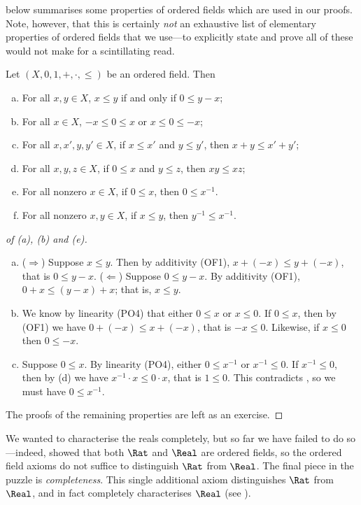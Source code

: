  below summarises some properties of ordered fields which are used in our proofs. Note, however, that this is certainly \textit{not} an exhaustive list of elementary properties of ordered fields that we use---to explicitly state and prove all of these would not make for a scintillating read.

\begin{theorem}
\label{thmPropertiesOfOrderedFields}
Let $(X,0,1,+,{\cdot},{\le})$ be an ordered field. Then
\begin{enumerate}[(a)]
\item For all $x,y \in X$, $x \le y$ if and only if $0 \le y-x$;
\item For all $x \in X$, $-x \le 0 \le x$ or $x \le 0 \le -x$;
\item For all $x,x',y,y' \in X$, if $x \le x'$ and $y \le y'$, then $x + y \le x' + y'$;
\item For all $x,y,z \in X$, if $0 \le x$ and $y \le z$, then $xy \le xz$;
\item For all nonzero $x \in X$, if $0 \le x$, then $0 \le x^{-1}$.
\item For all nonzero $x,y \in X$, if $x \le y$, then $y^{-1} \le x^{-1}$.
\end{enumerate}
\end{theorem}
\begin{proof}[of {(a)}, {(b)} and {(e)}]
$ $
\begin{enumerate}[(a)] 
\item ($\Rightarrow$) Suppose $x \le y$. Then by additivity (OF1), $x+(-x) \le y+(-x)$, that is $0 \le y-x$. ($\Leftarrow$) Suppose $0 \le y-x$. By additivity (OF1), $0+x \le (y-x)+x$; that is, $x \le y$.
\item We know by linearity (PO4) that either $0 \le x$ or $x \le 0$. If $0 \le x$, then by (OF1) we have $0+(-x) \le x+(-x)$, that is $-x \le 0$. Likewise, if $x \le 0$ then $0 \le -x$.
\setcounter{enumi}{4}
\item Suppose $0 \le x$. By linearity (PO4), either $0 \le x^{-1}$ or $x^{-1} \le 0$. If $x^{-1} \le 0$, then by (d) we have $x^{-1} \cdot x \le 0 \cdot x$, that is $1 \le 0$. This contradicts , so we must have $0 \le x^{-1}$.
\end{enumerate}
The proofs of the remaining properties are left as an exercise.
\end{proof}

We wanted to characterise the reals completely, but so far we have failed to do so---indeed,  showed that both $\Rat$ and $\Real$ are ordered fields, so the ordered field axioms do not suffice to distinguish $\Rat$ from $\Real$. The final piece in the puzzle is \textit{completeness}. This single additional axiom distinguishes $\Rat$ from $\Real$, and in fact completely characterises $\Real$ (see ).

